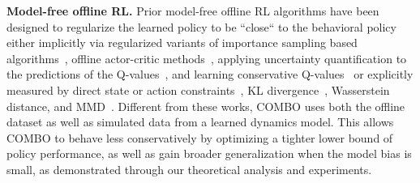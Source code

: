 \textbf{Model-free offline RL.} Prior model-free offline RL algorithms have been designed to regularize the learned policy to be ``close`` to the behavioral policy either implicitly via regularized variants of importance sampling based algorithms~\citep{precup2001off, sutton2016emphatic, LiuSAB19, SwaminathanJ15, nachum2019algaedice}, offline actor-critic methods~\citep{siegel2020keep, peng2019advantage}, applying uncertainty quantification to the predictions of the Q-values~\citep{agarwal2020optimistic, kumar2019stabilizing, wu2019behavior, levine2020offline}, and learning conservative Q-values~\citep{kumar2020conservative} or explicitly measured by direct state or action constraints~\cite{fujimoto2018off,liu2020provably},
KL divergence~\citep{jaques2019way,wu2019behavior, zhou2020plas}, Wasserstein distance, and MMD~\citep{kumar2019stabilizing}. 
Different from these works, COMBO uses both the offline dataset as well as simulated data from a learned dynamics model. This allows COMBO to behave less conservatively by optimizing a tighter lower bound of policy performance, as well as gain broader generalization when the model bias is small, as demonstrated through our theoretical analysis and experiments.
